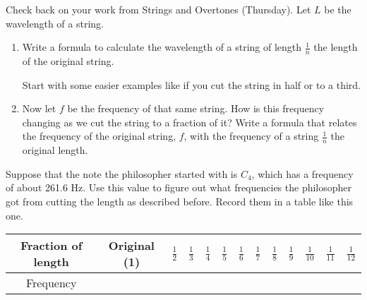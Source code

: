 \documentclass[12pt,noauthor,nooutcomes,hints,instructornotes]{ximera}%
\begin{document}
\begin{question}  Check back on your work from Strings and Overtones (Thursday). Let  $L$ be the wavelength of a string. 

\begin{enumerate}
    \item Write a formula to calculate the wavelength of a string of length $\frac{1}{n}$ the length of the original string.
\begin{hint}
Start with some easier examples like if you cut the string in half or to a third.
\end{hint}

\item Now let $f$ be the frequency of that same string. How is this frequency changing as we cut the string to a fraction of it? Write a formula that relates the frequency of the original string, $f$, with the frequency of a string $\frac{1}{n}$ the original length.
  \end{enumerate} 
  \end{question}
\begin{question} Suppose that the note the philosopher started with is $C_4$, which has a frequency of about 261.6 Hz. Use this value to figure out what frequencies the philosopher got from cutting the length as described before. Record them in a table like this one.

\begin{center}
\renewcommand{\arraystretch}{3}
\begin{tabular}{|c|c|c|c|c|c|c|c|c|c|c|c|c|}\hline
\footnotesize{Fraction of length} & \footnotesize{Original (1)} & \hspace{0.03in} $\frac{1}{2}$ \hspace{0.03in} & \hspace{0.03in} $\frac{1}{3}$ \hspace{0.03in} & \hspace{0.03in} $\frac{1}{4}$ \hspace{0.03in} & \hspace{0.03in} $\frac{1}{5}$ \hspace{0.03in} & \hspace{0.03in} $\frac{1}{6}$ \hspace{0.03in} & \hspace{0.03in} $\frac{1}{7}$ \hspace{0.03in} & \hspace{0.03in} $\frac{1}{8}$ \hspace{0.03in} & \hspace{0.03in} $\frac{1}{9}$ \hspace{0.03in} & \hspace{0.02in} $\frac{1}{10}$ \hspace{0.02in} & \hspace{0.02in} $\frac{1}{11}$ \hspace{0.02in} & \hspace{0.02in} $\frac{1}{12}$ \hspace{0.02in}    \\\hline
Frequency & &&&&&&&&&&& \\\hline
\end{tabular}
\end{center}
\end{question}
\end{document}
